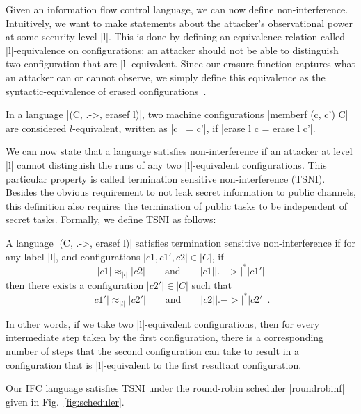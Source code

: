 Given an information flow control language, we can now define non-interference.
Intuitively, we want to make statements about the attacker's observational
power at some security level |l|.  This is done by defining an equivalence
relation called |l|-equivalence on configurations: an attacker should
not be able to distinguish two configuration that are |l|-equivalent.
%
Since our erasure function captures what an attacker can or cannot observe, we simply define this
equivalence as the syntactic-equivalence of erased configurations~\cite{stefan:addressing-covert}.
%
\begin{definition}[|l|-equivalence]
    In a language |(C, .->, erasef l)|, two machine configurations
    |memberf (c, c') C| are considered $l$-equivalent, written as |c ~= c'|,
    if |erase l c = erase l c'|.
\end{definition}
%

We can now state that a language satisfies non-interference if an
attacker at level |l| cannot distinguish the runs of any two |l|-equivalent
configurations.
%
This particular property is called termination sensitive non-interference
(TSNI).  Besides the obvious requirement to not leak secret information
to public channels, this definition also requires the termination
of public tasks to be independent of secret tasks.
%
Formally, we define TSNI as follows:

\begin{definition}
  A language |(C, .->, erasef l)| satisfies termination
  sensitive non-interference if for any label |l|, and configurations
  $|c1, c1', c2|\in|C|$, if
  \begin{equation} \label{eq:tsni-lhs}
    |c1| \approx_{|l|} |c2|
    \qquad \text{and} \qquad
    |c1| |.->|^* |c1'|
  \end{equation}
  then there exists a configuration $|c2'|\in|C|$ such that
  \begin{equation} \label{eq:tsni-rhs}
    |c1'| \approx_{|l|} |c2'|
     \qquad \text{and} \qquad
    |c2| |.->|^* |c2'|
    \ \text{.}
  \end{equation}
\end{definition}
%
In other words, if we take two |l|-equivalent configurations, then for every
intermediate step taken by the first configuration, there is a corresponding
number of steps that the second configuration can take to result in a
configuration that is |l|-equivalent to the first resultant configuration.


Our IFC language satisfies TSNI %
%
under the round-robin scheduler
|roundrobinf| given in Fig.~\ref{fig:scheduler}.

